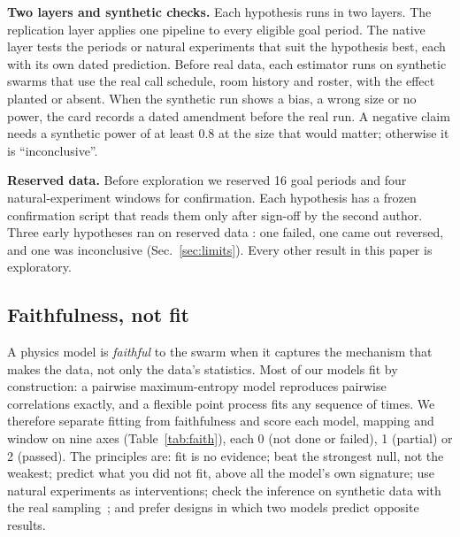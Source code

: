 \textbf{Two layers and synthetic checks.} Each hypothesis runs in two layers. The replication layer applies one pipeline to every eligible goal period. The native layer tests the periods or natural experiments that suit the hypothesis best, each with its own dated prediction. Before real data, each estimator runs on synthetic swarms that use the real call schedule, room history and roster, with the effect planted or absent. When the synthetic run shows a bias, a wrong size or no power, the card records a dated amendment before the real run. A negative claim needs a synthetic power of at least 0.8 at the size that would matter; otherwise it is ``inconclusive''.

\textbf{Reserved data.} Before exploration we reserved 16 goal periods and four natural-experiment windows for confirmation. Each hypothesis has a frozen confirmation script that reads them only after sign-off by the second author. Three early hypotheses ran on reserved data : one failed, one came out reversed, and one was inconclusive (Sec.~\ref{sec:limits}). Every other result in this paper is exploratory.

\subsection{Faithfulness, not fit}\label{sec:faith}
A physics model is \emph{faithful} to the swarm when it captures the mechanism that makes the data, not only the data's statistics. Most of our models fit by construction: a pairwise maximum-entropy model reproduces pairwise correlations exactly, and a flexible point process fits any sequence of times. We therefore separate fitting from faithfulness and score each model, mapping and window on nine axes (Table~\ref{tab:faith}), each 0 (not done or failed), 1 (partial) or 2 (passed). The principles are: fit is no evidence; beat the strongest null, not the weakest; predict what you did not fit, above all the model's own signature; use natural experiments as interventions; check the inference on synthetic data with the real sampling~\cite{talts2018}; and prefer designs in which two models predict opposite results.

